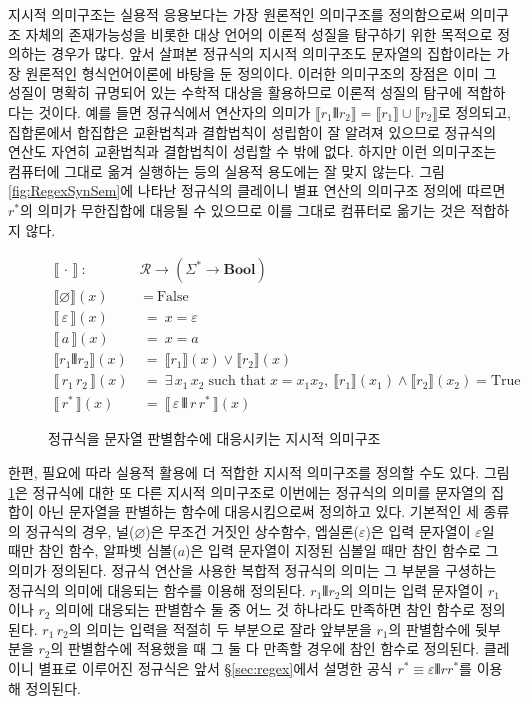 지시적 의미구조는 실용적 응용보다는 가장 원론적인 의미구조를 정의함으로써
의미구조 자체의 존재가능성을 비롯한 대상 언어의 이론적 성질을 탐구하기 위한
목적으로 정의하는 경우가 많다. 앞서 살펴본 정규식의 지시적 의미구조도
문자열의 집합이라는 가장 원론적인 형식언어이론에 바탕을 둔 정의이다.
이러한 의미구조의 장점은 이미 그 성질이 명확히 규명되어 있는 수학적 대상을
활용하므로 이론적 성질의 탐구에 적합하다는 것이다. 예를 들면
정규식에서 \VERT 연산자의 의미가 $ \llbracket r_1\VERT r_2\rrbracket
= \llbracket r_1\rrbracket\cup\llbracket r_2\rrbracket$로 정의되고,
집합론에서 합집합은 교환법칙과 결합법칙이 성립함이 잘 알려져 있으므로
정규식의 \VERT 연산도 자연히 교환법칙과 결합법칙이 성립할 수 밖에 없다.
하지만 이런 의미구조는 컴퓨터에 그대로 옮겨 실행하는 등의 실용적 용도에는
잘 맞지 않는다. 그림\;\ref{fig:RegexSynSem}에 나타난 정규식의
클레이니 별표 연산의 의미구조 정의에 따르면 $r^{*}$의 의미가 무한집합에
대응될 수 있으므로 이를 그대로 컴퓨터로 옮기는 것은 적합하지 않다.

\begin{figure}
\begin{align*}
\llbracket\,\cdot\,\rrbracket
 ~:~& \mathcal{R} \to (\Sigma^{*} \to \textbf{Bool})
\\
\llbracket \varnothing \rrbracket(x)   &~=~ \text{False} \\
\llbracket\,\varepsilon\,\rrbracket(x) &~=~ x=\varepsilon \\
\llbracket\,a\,\rrbracket(x)           &~=~ x=a \\
\llbracket r_1 \VERT r_2 \rrbracket(x) &~=~
 \llbracket r_1\rrbracket(x) \lor \llbracket r_2\rrbracket(x)\\
\llbracket\,r_1 \, r_2\,\rrbracket(x) &~=~
  \exists\,x_1\,x_2 \;\text{such that}\; x=x_1x_2,~
  \llbracket r_1\rrbracket(x_1) \land \llbracket r_2\rrbracket(x_2)
  = \text{True} \\
\llbracket\, r^{*} \,\rrbracket(x) &~=~
 \llbracket\,\varepsilon\,\VERT\,r\,r^{*}\,\rrbracket(x)
\end{align*}
\caption{정규식을 문자열 판별함수에 대응시키는
         지시적 의미구조\label{fig:RegexDenoSem}}
\end{figure}

한편, 필요에 따라 실용적 활용에 더 적합한 지시적 의미구조를
정의할 수도 있다. 그림\;\ref{fig:RegexDenoSem}은 정규식에 대한
또 다른 지시적 의미구조로 이번에는 정규식의 의미를 문자열의 집합이
아닌 문자열을 판별하는 함수에 대응시킴으로써 정의하고 있다. 기본적인
세 종류의 정규식의 경우, 널($\varnothing$)은 무조건 거짓인 상수함수,
엡실론($\varepsilon$)은 입력 문자열이 $\varepsilon$일 때만 참인 함수,
알파벳 심볼($a$)은 입력 문자열이 지정된 심볼일 때만 참인 함수로 그
의미가 정의된다. 정규식 연산을 사용한 복합적 정규식의 의미는
그 부분을 구셩하는 정규식의 의미에 대응되는 함수를 이용해 정의된다.
$r_1\VERT r_2$의 의미는 입력 문자열이 $r_1$이나 $r_2$ 의미에 대응되는
판별함수 둘 중 어느 것 하나라도 만족하면 참인 함수로 정의된다.
$r_1\,r_2$의 의미는 입력을 적절히 두 부분으로 잘라 앞부분을 $r_1$의
판별함수에 뒷부분을 $r_2$의 판별함수에 적용했을 때 그 둘 다
만족할 경우에 참인 함수로 정의된다. 클레이니 별표로
이루어진 정규식은 앞서 \S\ref{sec:regex}에서 설명한 공식
$r^{*} \equiv \varepsilon\VERT rr^{*}$를 이용해 정의된다.

